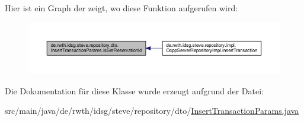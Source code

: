Hier ist ein Graph der zeigt, wo diese Funktion aufgerufen wird\+:\nopagebreak
\begin{figure}[H]
\begin{center}
\leavevmode
\includegraphics[width=350pt]{classde_1_1rwth_1_1idsg_1_1steve_1_1repository_1_1dto_1_1_insert_transaction_params_ae07ba84ac72f8fca7764d902dd198de5_icgraph}
\end{center}
\end{figure}




Die Dokumentation für diese Klasse wurde erzeugt aufgrund der Datei\+:\begin{DoxyCompactItemize}
\item 
src/main/java/de/rwth/idsg/steve/repository/dto/\hyperlink{_insert_transaction_params_8java}{Insert\+Transaction\+Params.\+java}\end{DoxyCompactItemize}
